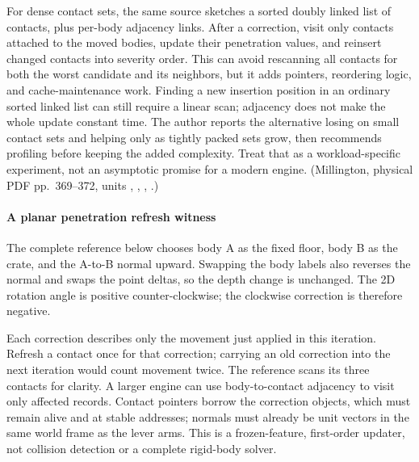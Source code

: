 For dense contact sets, the same source sketches a sorted doubly linked list of contacts, plus per-body adjacency links. After a correction, visit only contacts attached to the moved bodies, update their penetration values, and reinsert changed contacts into severity order. This can avoid rescanning all contacts for both the worst candidate and its neighbors, but it adds pointers, reordering logic, and cache-maintenance work. Finding a new insertion position in an ordinary sorted linked list can still require a linear scan; adjacency does not make the whole update constant time. The author reports the alternative losing on small contact sets and helping only as tightly packed sets grow, then recommends profiling before keeping the added complexity. Treat that as a workload-specific experiment, not an asymptotic promise for a modern engine. (Millington, physical PDF pp.~369--372, units , , , .)

\paragraph{A planar penetration refresh witness}\label{06-engine-ii-ch046-a-planar-penetration-refresh-witness}

\hypertarget{06-engine-ii-ch046-a-planar-penetration-refresh-witness}{}

The complete reference below chooses body A as the fixed floor, body B as the crate, and the A-to-B normal upward. Swapping the body labels also reverses the normal and swaps the point deltas, so the depth change is unchanged. The 2D rotation angle is positive counter-clockwise; the clockwise correction is therefore negative.

Each correction describes only the movement just applied in this iteration. Refresh a contact once for that correction; carrying an old correction into the next iteration would count movement twice. The reference scans its three contacts for clarity. A larger engine can use body-to-contact adjacency to visit only affected records. Contact pointers borrow the correction objects, which must remain alive and at stable addresses; normals must already be unit vectors in the same world frame as the lever arms. This is a frozen-feature, first-order updater, not collision detection or a complete rigid-body solver.

